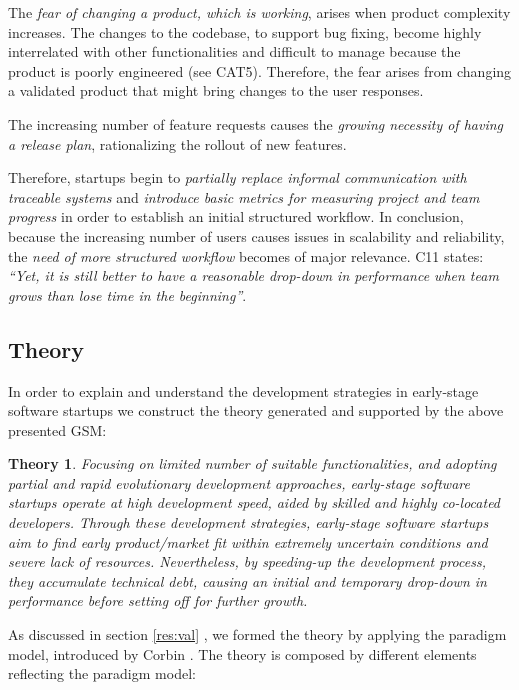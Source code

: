 \documentclass[10pt,journal,letterpaper,compsoc]{IEEEtran}
\newtheorem*{theory}{Theory}
\begin{document}
The \textit{fear of changing a product, which is working}, arises when product
complexity increases. The changes to the codebase, to support bug fixing, become
highly interrelated with other functionalities and difficult to manage because
the product is poorly engineered (see CAT5). Therefore, the fear arises from
changing a validated product that might bring changes to the user responses.

The increasing number of feature requests causes the \textit{growing necessity
of having a release plan}, rationalizing the rollout of new features.

Therefore, startups begin to \textit{partially replace informal communication
with traceable systems} and \textit{introduce basic metrics for measuring
project and team progress} in order to establish an initial structured workflow.
In conclusion, because the increasing number of users causes issues in
scalability and reliability, the \textit{need of more structured workflow}
becomes of major relevance. C11 states: \textit{``Yet, it is still better to
have a reasonable drop-down in performance when team grows than lose time in the
beginning''}.
\subsection{Theory}\label{res:gsm:th}
In order to explain and understand the development strategies in early-stage  
software startups we construct the theory generated and supported by the above  
presented GSM:

\begin{theory} Focusing on limited number of suitable functionalities, and
adopting partial  and rapid evolutionary development approaches, early-stage
software startups  operate at high development speed, aided by skilled and
highly co-located  developers. Through these development strategies, early-stage
software startups  aim to find early product/market fit within extremely
uncertain conditions and  severe lack of resources. Nevertheless, by speeding-up
the development process,  they accumulate technical debt, causing an initial and
temporary drop-down in  performance before setting off for further growth.
\end{theory}

As discussed in section \ref{res:val} %
, we formed the theory by applying the paradigm model, introduced by Corbin
\cite{Corbin1990}. The theory is composed by different elements reflecting the
paradigm model:
\end{document}
